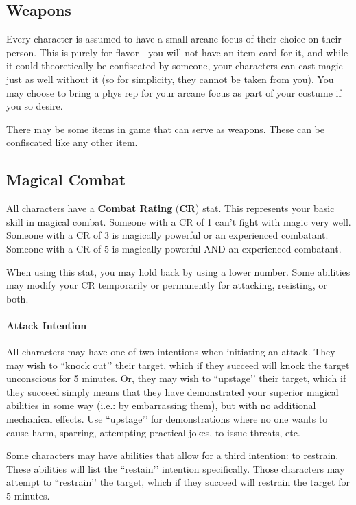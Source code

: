 \documentclass[sheet]{GL2020}
\begin{document}
\subsection{Weapons}
Every character is assumed to have a small arcane focus of their choice on their person. This is purely for flavor - you will not have an item card for it, and while it could theoretically be confiscated by someone, your characters can cast magic just as well without it (so for simplicity, they cannot be taken from you). You may choose to bring a phys rep for your arcane focus as part of your costume if you so desire.

There may be some items in game that can serve as weapons. These can be confiscated like any other item.

\subsection{Magical Combat}
All characters have a {\bf Combat Rating} ({\bf CR}) stat. This represents your basic skill in magical combat. Someone with a CR of 1 can't fight with magic very well. Someone with a CR of 3 is magically powerful or an experienced combatant. Someone with a CR of 5 is magically powerful AND an experienced combatant. 

When using this stat, you may hold back by using a lower number. Some abilities may modify your CR temporarily or permanently for attacking, resisting, or both.

\paragraph{Attack Intention} All characters may have one of two intentions when initiating an attack. They may wish to ``knock out’’ their target, which if they succeed will knock the target unconscious for 5 minutes. Or, they may wish to ``upstage’’ their target, which if they succeed simply means that they have demonstrated your superior magical abilities in some way (i.e.: by embarrassing them), but with no additional mechanical effects. Use ``upstage’’ for demonstrations where no one wants to cause harm, sparring, attempting practical jokes, to issue threats, etc.

Some characters may have abilities that allow for a third intention: to restrain. These abilities will list the ``restain’’ intention specifically. Those characters may attempt to ``restrain’’ the target, which if they succeed will restrain the target for 5 minutes. 
\end{document}
